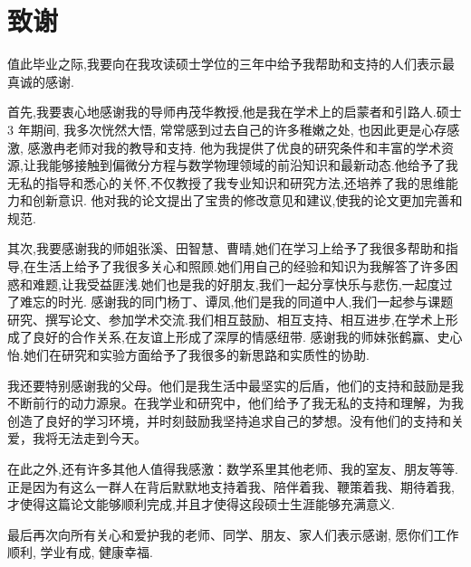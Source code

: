 \chapter{致谢}
值此毕业之际,我要向在我攻读硕士学位的三年中给予我帮助和支持的人们表示最真诚的感谢.

首先,我要衷心地感谢我的导师冉茂华教授,他是我在学术上的启蒙者和引路人.硕士 3 年期间, 我多次恍然大悟, 常常感到过去自己的许多稚嫩之处, 也因此更是心存感激, 感激冉老师对我的教导和支持.
他为我提供了优良的研究条件和丰富的学术资源,让我能够接触到偏微分方程与数学物理领域的前沿知识和最新动态.他给予了我无私的指导和悉心的关怀,不仅教授了我专业知识和研究方法,还培养了我的思维能力和创新意识.
他对我的论文提出了宝贵的修改意见和建议,使我的论文更加完善和规范.

其次,我要感谢我的师姐张溪、田智慧、曹晴,她们在学习上给予了我很多帮助和指导,在生活上给予了我很多关心和照顾.她们用自己的经验和知识为我解答了许多困惑和难题,让我受益匪浅.她们也是我的好朋友,我们一起分享快乐与悲伤,一起度过了难忘的时光.
感谢我的同门杨丁、谭凤,他们是我的同道中人,我们一起参与课题研究、撰写论文、参加学术交流.我们相互鼓励、相互支持、相互进步,在学术上形成了良好的合作关系,在友谊上形成了深厚的情感纽带.
感谢我的师妹张鹤赢、史心怡.她们在研究和实验方面给予了我很多的新思路和实质性的协助.%

我还要特别感谢我的父母。他们是我生活中最坚实的后盾，他们的支持和鼓励是我不断前行的动力源泉。在我学业和研究中，他们给予了我无私的支持和理解，为我创造了良好的学习环境，并时刻鼓励我坚持追求自己的梦想。没有他们的支持和关爱，我将无法走到今天。

在此之外,还有许多其他人值得我感激：数学系里其他老师、我的室友、朋友等等.正是因为有这么一群人在背后默默地支持着我、陪伴着我、鞭策着我、期待着我,才使得这篇论文能够顺利完成,并且才使得这段硕士生涯能够充满意义.

最后再次向所有关心和爱护我的老师、同学、朋友、家人们表示感谢, 愿你们工作顺利, 学业有成, 健康幸福.

